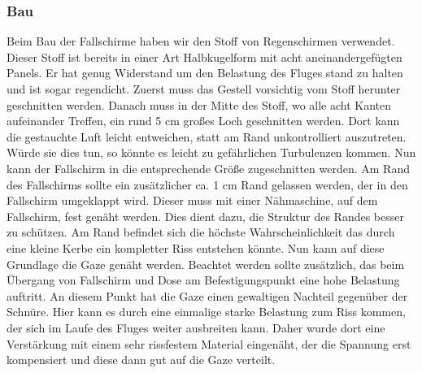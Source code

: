 \subsubsection{Bau}
Beim Bau der Fallschirme haben wir den Stoff von Regenschirmen verwendet. Dieser Stoff ist bereits in einer Art Halbkugelform mit acht aneinandergefügten Panels. Er hat genug Widerstand um den Belastung des Fluges stand zu halten und ist sogar regendicht. Zuerst muss das Gestell vorsichtig vom Stoff herunter geschnitten werden. Danach muss in der Mitte des Stoff, wo alle acht Kanten aufeinander Treffen, ein rund 5 cm großes Loch geschnitten werden. Dort kann die gestauchte Luft leicht entweichen, statt am Rand unkontrolliert auszutreten. Würde sie dies tun, so könnte es leicht zu gefährlichen Turbulenzen kommen. Nun kann der Fallschirm in die entsprechende Größe zugeschnitten werden. Am Rand des Fallschirms sollte ein zusätzlicher ca. 1 cm Rand gelassen werden, der in den Fallschirm umgeklappt wird. Dieser muss mit einer Nähmaschine, auf dem Fallschirm, fest genäht werden. Dies dient dazu, die Struktur des Randes besser zu schützen. Am Rand befindet sich die höchste Wahrscheinlichkeit das durch eine kleine Kerbe ein kompletter Riss entstehen könnte. Nun kann auf diese Grundlage die Gaze genäht werden. Beachtet werden sollte zusätzlich, das beim Übergang von Fallschirm und Dose am Befestigungspunkt eine hohe Belastung auftritt. An diesem Punkt hat die Gaze einen gewaltigen Nachteil gegenüber der Schnüre. Hier kann es durch eine einmalige starke Belastung zum Riss kommen, der sich im Laufe des Fluges weiter ausbreiten kann. Daher wurde dort eine Verstärkung mit einem sehr rissfestem Material eingenäht, der die Spannung erst kompensiert und diese dann gut auf die Gaze verteilt.